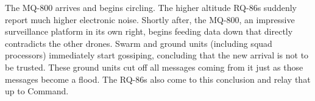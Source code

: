 %
%
%

The MQ-800 arrives and begins circling.
The higher altitude RQ-86s suddenly report much higher electronic noise.
Shortly after, the MQ-800, an impressive surveillance platform in its own right, begins feeding data down that directly contradicts the other drones.
Swarm and ground units (including squad processors) immediately start gossiping, concluding that the new arrival is not to be trusted.
These ground units cut off all messages coming from it just as those messages become a flood.
The RQ-86s also come to this conclusion and relay that up to Command.
